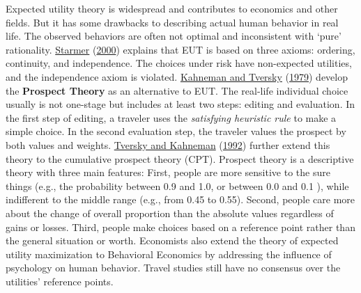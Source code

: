 \documentclass[
  12pt,
]{article}
\begin{document}
Expected utility theory is widespread and contributes to economics and other fields. But it has some drawbacks to describing actual human behavior in real life. The observed behaviors are often not optimal and inconsistent with `pure' rationality. \protect\hyperlink{ref-starmerDevelopmentsNonexpectedUtility2000}{Starmer} (\protect\hyperlink{ref-starmerDevelopmentsNonexpectedUtility2000}{2000}) explains that EUT is based on three axioms: ordering, continuity, and independence. The choices under risk have non-expected utilities, and the independence axiom is violated. \protect\hyperlink{ref-kahnemanProspectTheoryAnalysis1979a}{Kahneman and Tversky} (\protect\hyperlink{ref-kahnemanProspectTheoryAnalysis1979a}{1979}) develop the \textbf{Prospect Theory} as an alternative to EUT. The real-life individual choice usually is not one-stage but includes at least two steps: editing and evaluation. In the first step of editing, a traveler uses the \emph{satisfying heuristic rule} to make a simple choice. In the second evaluation step, the traveler values the prospect by both values and weights. \protect\hyperlink{ref-tverskyAdvancesProspectTheory1992}{Tversky and Kahneman} (\protect\hyperlink{ref-tverskyAdvancesProspectTheory1992}{1992}) further extend this theory to the cumulative prospect theory (CPT). Prospect theory is a descriptive theory with three main features: First, people are more sensitive to the sure things (e.g., the probability between 0.9 and 1.0, or between 0.0 and 0.1 ), while indifferent to the middle range (e.g., from 0.45 to 0.55). Second, people care more about the change of overall proportion than the absolute values regardless of gains or losses. Third, people make choices based on a reference point rather than the general situation or worth. Economists also extend the theory of expected utility maximization to Behavioral Economics by addressing the influence of psychology on human behavior. Travel studies still have no consensus over the utilities' reference points.
\end{document}
